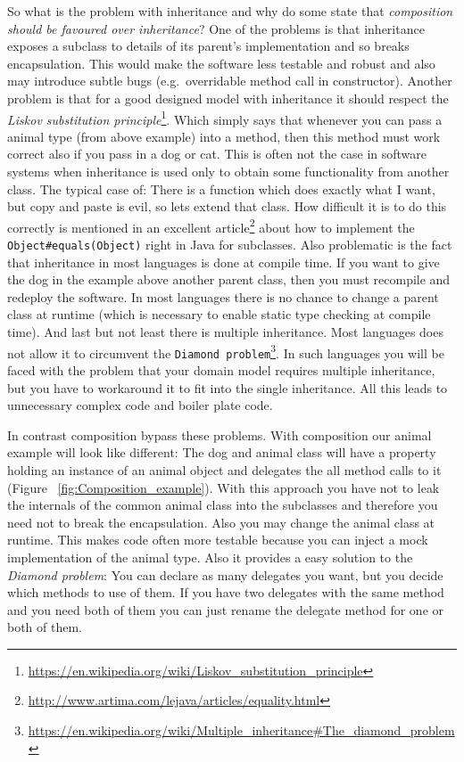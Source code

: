 \documentclass[11pt, a4paper]{report}
\begin{document}
So what is the problem with inheritance and why do some state that \textit{composition should be favoured over inheritance}? One of the problems is that inheritance exposes a subclass to details of its parent's implementation and so breaks encapsulation\cite{gang-of-four}. This would make the software less testable and robust and also may introduce subtle bugs (e.g.\ overridable method call in constructor). Another problem is that for a good designed model with inheritance it should respect the \textit{Liskov substitution principle}\footnote{\url{https://en.wikipedia.org/wiki/Liskov_substitution_principle}}. Which simply says that whenever you can pass a animal type (from above example) into a method, then this method must work correct also if you pass in a dog or cat. This is often not the case in software systems when inheritance is used only to obtain some functionality from another class. The typical case of: There is a function which does exactly what I want, but copy and paste is evil, so lets extend that class. How difficult it is to do this correctly is mentioned in an excellent article\footnote{\url{http://www.artima.com/lejava/articles/equality.html}} about how to implement the \texttt{Object\#equals(Object)} right in Java for subclasses. Also problematic is the fact that inheritance in most languages is done at compile time. If you want to give the dog in the example above another parent class, then you must recompile and redeploy the software. In most languages there is no chance to change a parent class at runtime (which is necessary to enable static type checking at compile time). And last but not least there is multiple inheritance. Most languages does not allow it to circumvent the \texttt{Diamond problem}\footnote{\url{https://en.wikipedia.org/wiki/Multiple_inheritance\#The_diamond_problem}}. In such languages you will be faced with the problem that your domain model requires multiple inheritance, but you have to workaround it to fit into the single inheritance. All this leads to unnecessary complex code and boiler plate code.

In contrast composition bypass these problems. With composition our animal example will look like different: The dog and animal class will have a property holding an instance of an animal object and delegates the all method calls to it (Figure ~\ref{fig:Composition_example}). With this approach you have not to leak the internals of the common animal class into the subclasses and therefore you need not to break the encapsulation. Also you may change the animal class at runtime. This makes code often more testable because you can inject a mock implementation of the animal type. Also it provides a easy solution to the \textit{Diamond problem}: You can declare as many delegates you want, but you decide which methods to use of them. If you have two delegates with the same method and you need both of them you can just rename the delegate method for one or both of them.
\end{document}
